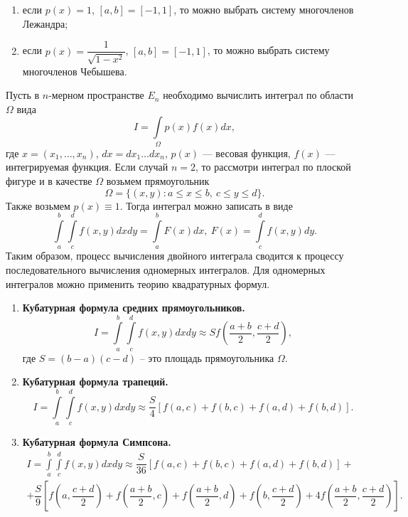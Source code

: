 \documentclass[a4paper, 12pt]{report}
\numberwithin{equation}{section}
\renewcommand{\leq}{\leqslant}
\begin{document}
	 \begin{enumerate}
	 	\item если $p(x) = 1$, $[a,b]=[-1,1]$, то можно выбрать систему многочленов Лежандра;
	 	\item если $p(x) = \dfrac{1}{\sqrt{1-x^2}}$, $[a,b]=[-1,1]$, то можно выбрать систему многочленов Чебышева.
	 \end{enumerate}
	 Пусть в $n$-мерном пространстве $E_n$ необходимо вычислить интеграл по области $\Omega$ вида $$I = \int\limits_\Omega p(x)f(x)dx,$$
	 где $x = (x_1,\ldots, x_n)$, $dx = dx_1\ldots dx_n$, $p(x)$ --- весовая функция, $f(x)$ --- интегрируемая функция. Если случай $n=2$, то рассмотри интеграл по плоской фигуре и в качестве $\Omega$ возьмем прямоугольник $$\Omega = \{(x,y): a\leq x \leq b,\ c \leq y \leq d\}.$$
	 Также возьмем $p(x)\equiv 1$. Тогда интеграл можно записать в виде $$\int\limits_a^b\int\limits_c^d f(x,y)dxdy = \int\limits_a^b F(x)dx,\ F(x) = \int\limits_c^d f(x,y)dy.$$
	 Таким образом, процесс вычисления двойного интеграла сводится к процессу последовательного вычисления одномерных интегралов. Для одномерных интегралов можно применить теорию квадратурных формул.
	 \begin{enumerate}
	 	\item \textbf{Кубатурная формула средних прямоугольников.}
	 	$$I = \int\limits_a^b \int\limits_c^d f(x,y)dxdy\approx S f\left(\dfrac{a+b}{2}, \dfrac{c+d}{2}\right),$$ где $S = (b-a)(c-d)$ -- это площадь прямоугольника $\Omega$.
	 	\item \textbf{Кубатурная формула трапеций.}
	 	$$I=\int\limits_a^b \int\limits_c^d f(x,y)dxdy\approx \dfrac{S}{4}\left[f(a,c) + f(b,c)+f(a,d)+f(b,d)\right].$$
	 	\item \textbf{Кубатурная формула Симпсона.}
	 	\begin{multline*}
	 		I=\int\limits_a^b \int\limits_c^d f(x,y)dxdy\approx \dfrac{S}{36}\left[f(a,c) + f(b,c)+f(a,d)+f(b,d)\right] +\\+ \dfrac S9 \left[f\left(a,\dfrac{c+d}{2}\right) + f\left(\dfrac{a+b}{2},c\right)+f\left(\dfrac{a+b}{2},d\right)+f\left(b,\dfrac{c+d}{2}\right) +4f\left(\dfrac{a+b}{2},\dfrac{c+d}{2}\right)\right].
	 	\end{multline*}
	 \end{enumerate}
\end{document}
